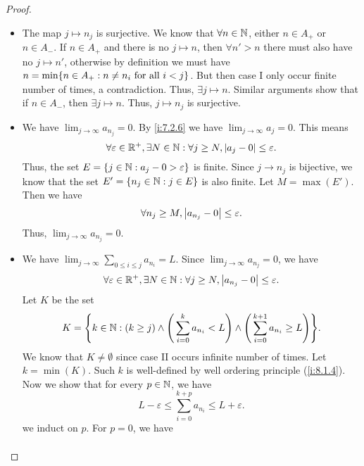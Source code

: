 \begin{proof}
\begin{itemize}
          But this means \(\sum_{n \in A_-} a_n\) is absolutely convergent, a contradiction.
          Thus, case I occurs infinite number of times.
          Similar proof show that case II also occurs infinite number of times.
    \item The map \(j \mapsto n_j\) is surjective.
          We know that \(\forall n \in \mathbb{N}\), either \(n \in A_+\) or \(n \in A_-\).
          If \(n \in A_+\) and there is no \(j \mapsto n\), then \(\forall n' > n\) there must also have no \(j \mapsto n'\), otherwise by definition we must have \(n = \min\set{n \in A_+ : n \neq n_i \text{ for all } i < j}\).
          But then case I only occur finite number of times, a contradiction.
          Thus, \(\exists j \mapsto n\).
          Similar arguments show that if \(n \in A_-\), then \(\exists j \mapsto n\).
          Thus, \(j \mapsto n_j\) is surjective.
    \item We have \(\lim_{j \to \infty} a_{n_j} = 0\).
          By \cref{i:7.2.6} we have \(\lim_{j \to \infty} a_j = 0\).
          This means
          \[
            \forall \varepsilon \in \mathbb{R}^+, \exists N \in \mathbb{N} : \forall j \geq N, \left\lvert a_j - 0\right\rvert \leq \varepsilon.
          \]
          Thus, the set \(E = \left\lbrace j \in \mathbb{N} : a_j - 0 > \varepsilon\right\rbrace\) is finite.
          Since \(j \to n_j\) is bijective, we know that the set \(E' = \left\lbrace n_j \in \mathbb{N} : j \in E\right\rbrace\) is also finite.
          Let \(M = \max(E')\).
          Then we have
          \[
            \forall n_j \geq M, \left\lvert a_{n_j} - 0\right\rvert \leq \varepsilon.
          \]
          Thus, \(\lim_{j \to \infty} a_{n_j} = 0\).
    \item We have \(\lim_{j \to \infty} \sum_{0 \leq i \leq j} a_{n_i} = L\).
          Since \(\lim_{j \to \infty} a_{n_j} = 0\), we have
          \[
            \forall \varepsilon \in \mathbb{R}^+, \exists N \in \mathbb{N} : \forall j \geq N, \left\lvert a_{n_j} - 0\right\rvert \leq \varepsilon.
          \]
          Let \(K\) be the set
          \[
            K = \set{k \in \N : (k \geq j) \land \Bigg(\sum_{i = 0}^k a_{n_i} < L\Bigg) \land \Bigg(\sum_{i = 0}^{k + 1} a_{n_i} \geq L\Bigg)}.
          \]
          We know that \(K \neq \emptyset\) since case II occurs infinite number of times.
          Let \(k = \min(K)\).
          Such \(k\) is well-defined by well ordering principle (\cref{i:8.1.4}).
          Now we show that for every \(p \in \mathbb{N}\), we have
          \[
            L - \varepsilon \leq \sum_{i = 0}^{k + p} a_{n_i} \leq L + \varepsilon.
          \]
          we induct on \(p\).
          For \(p = 0\), we have
          \begin{align*}

\end{align*}
\end{itemize}
\end{proof}
